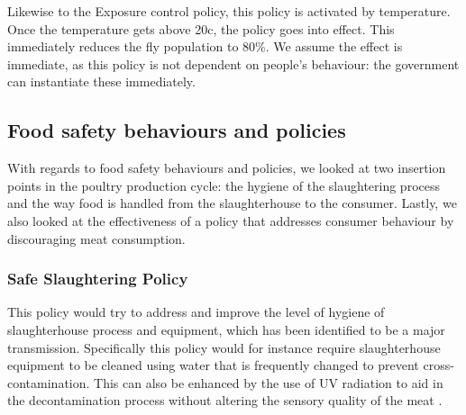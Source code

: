 Likewise to the Exposure control policy, this policy is activated by temperature. Once the temperature gets above 20\degree c, the policy goes into effect. This immediately reduces the fly population to 80\%. We assume the effect is immediate, as this policy is not dependent on people's behaviour: the government can instantiate these immediately.

\subsection{Food safety behaviours and policies}
\label{s:foodbehaviour}
With regards to food safety behaviours and policies, we looked at two insertion points in the poultry production cycle: the hygiene of the slaughtering process and the way food is handled from the slaughterhouse to the consumer. Lastly, we also looked at the effectiveness of a policy that addresses consumer behaviour by discouraging meat consumption.

\subsubsection{Safe Slaughtering Policy}
This policy would try to address and improve the level of hygiene of slaughterhouse process and equipment, which has been identified to be a major transmission. Specifically this policy would for instance require slaughterhouse equipment to be cleaned using water that is frequently changed to prevent cross-contamination. This can also be enhanced by the use of UV radiation to aid in the decontamination process without altering the sensory quality of the meat \parencite{isohanni_use_2009}.


